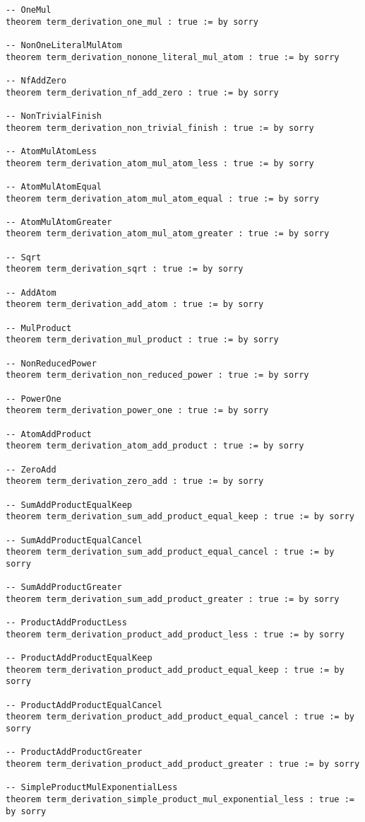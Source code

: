 \documentclass{article}
\begin{document}
\begin{tcolorbox}[colback=white!10, width=\linewidth]
\begin{lstlisting}[language=Lean4]
-- OneMul
theorem term_derivation_one_mul : true := by sorry

-- NonOneLiteralMulAtom
theorem term_derivation_nonone_literal_mul_atom : true := by sorry

-- NfAddZero
theorem term_derivation_nf_add_zero : true := by sorry

-- NonTrivialFinish
theorem term_derivation_non_trivial_finish : true := by sorry

-- AtomMulAtomLess
theorem term_derivation_atom_mul_atom_less : true := by sorry

-- AtomMulAtomEqual
theorem term_derivation_atom_mul_atom_equal : true := by sorry

-- AtomMulAtomGreater
theorem term_derivation_atom_mul_atom_greater : true := by sorry

-- Sqrt
theorem term_derivation_sqrt : true := by sorry

-- AddAtom
theorem term_derivation_add_atom : true := by sorry

-- MulProduct
theorem term_derivation_mul_product : true := by sorry

-- NonReducedPower
theorem term_derivation_non_reduced_power : true := by sorry

-- PowerOne
theorem term_derivation_power_one : true := by sorry

-- AtomAddProduct
theorem term_derivation_atom_add_product : true := by sorry

-- ZeroAdd
theorem term_derivation_zero_add : true := by sorry

-- SumAddProductEqualKeep
theorem term_derivation_sum_add_product_equal_keep : true := by sorry

-- SumAddProductEqualCancel
theorem term_derivation_sum_add_product_equal_cancel : true := by sorry

-- SumAddProductGreater
theorem term_derivation_sum_add_product_greater : true := by sorry

-- ProductAddProductLess
theorem term_derivation_product_add_product_less : true := by sorry

-- ProductAddProductEqualKeep
theorem term_derivation_product_add_product_equal_keep : true := by sorry

-- ProductAddProductEqualCancel
theorem term_derivation_product_add_product_equal_cancel : true := by sorry

-- ProductAddProductGreater
theorem term_derivation_product_add_product_greater : true := by sorry

-- SimpleProductMulExponentialLess
theorem term_derivation_simple_product_mul_exponential_less : true := by sorry


\end{lstlisting}
\end{tcolorbox}
\end{document}

